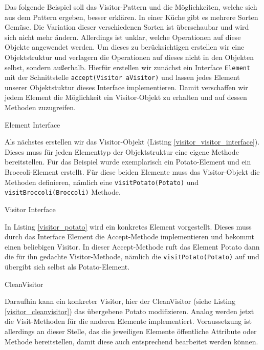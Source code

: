 
Das folgende Beispiel soll das Visitor-Pattern und die Möglichkeiten, welche sich aus dem Pattern ergeben, besser erklären. In einer Küche gibt es mehrere Sorten Gemüse. Die Variation dieser verschiedenen Sorten ist überschaubar und wird sich nicht mehr ändern. Allerdings ist unklar, welche Operationen auf diese Objekte angewendet werden. Um dieses zu berücksichtigen erstellen wir eine Objektstruktur und verlagern die Operationen auf dieses nicht in den Objekten selbst, sondern außerhalb. Hierfür erstellen wir zunächst ein Interface \texttt{Element} mit der Schnittstelle \texttt{accept(Visitor aVisitor)} und lassen jedes Element unserer Objektstuktur dieses Interface implementieren. Damit verschaffen wir jedem Element die Möglichkeit ein Visitor-Objekt zu erhalten und auf dessen Methoden zuzugreifen.


\begin{listing}[h!]
   \centering
   \caption{Element Interface}
    \label{visitor_element_interface}
\end{listing}  

Als nächstes erstellen wir das Visitor-Objekt (Listing \ref{visitor_visitor_interface}). Dieses muss für jeden Elementtyp der Objektstruktur eine eigene Methode bereitstellen. Für das Beispiel wurde exemplarisch ein Potato-Element und ein Broccoli-Element erstellt. Für diese beiden Elemente muss das Visitor-Objekt die Methoden definieren, nämlich eine \texttt{visitPotato(Potato)} und \texttt{visitBroccoli(Broccoli)} Methode.


\begin{listing}[h!]
   \centering
   \caption{Visitor Interface}
    \label{visitor_visitor_interface}
\end{listing}  

In Listing \ref{visitor_potato} wird ein konkretes Element vorgestellt. Dieses muss durch das Interface Element die Accept-Methode implementieren und bekommt einen beliebigen Visitor.
In dieser Accept-Methode ruft das Element Potato dann die für ihn gedachte Visitor-Methode, nämlich die \texttt{visitPotato(Potato)} auf und übergibt sich selbst als Potato-Element.

\begin{listing}[h!]
   \centering
   \caption{CleanVisitor}
    \label{visitor_potato}
\end{listing}  

Daraufhin kann ein konkreter Visitor, hier der CleanVisitor (siehe Listing \ref{visitor_cleanvisitor}) das übergebene Potato modifizieren. Analog werden jetzt die Visit-Methoden für die anderen Elemente implementiert. Voraussetzung ist allerdings an dieser Stelle, das die jeweiligen Elemente öffentliche Attribute oder Methode bereitstellen, damit diese auch entsprechend bearbeitet werden können.

